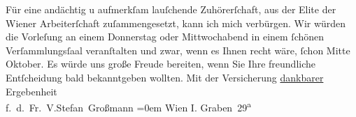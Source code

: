 \begin{ledgroupsized}[t]{13cm}
           \pstart
           Für eine andächtig u aufmerkſam lauſchende Zuhörerſchaft, aus der Elite der Wiener Arbeiterſchaft zuſammengesetzt, kann ich mich
               verbürgen.\pend
           \pstart
           Wir würden die Vorleſung an einem Donnerstag oder Mittwochabend in einem ſchönen
               Verſammlungsſaal veranſtalten und zwar, wenn es Ihnen recht wäre, ſchon Mitte
               Oktober.\pend
           \pstart
            Es würde uns große Freude bereiten, wenn Sie
               Ihre freundliche Entſcheidung bald bekanntgeben wollten.\pend
           \pstart
           Mit der Versicherung \uline{dankbarer} Ergebenheit{\\[\baselineskip]}
                  f. d. Fr. V.\spacefill\mbox{Stefan
                  Großmann}\pend
           \leftskip=0em{}\pstart
           \noindent{}Wien I. Graben 29\textsuperscript{a}\pend
                     \endnumbering{}\end{ledgroupsized}  \newcommand{\dateiname}{L01711}\newcommand{\titel}{Stefan Großmann an Arthur Schnitzler, 27. 9. 1907}\newcommand{\editorInnen}{ Martin Anton Müller und Gerd-Hermann Susen}
            \footnotesize
\begin{ledgroupsized}[t]{11.5cm}
\end{ledgroupsized}
         
      